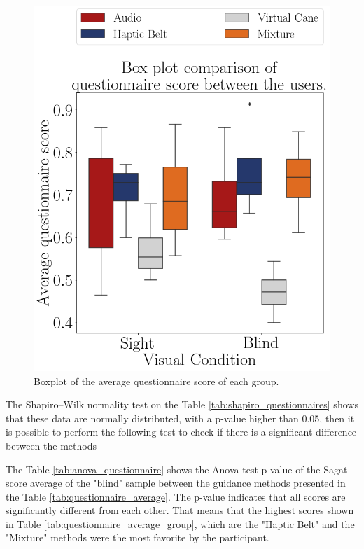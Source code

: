 

\begin{figure}[!htb]
    \centering
    \includegraphics[width = 0.5\linewidth]{Resultados/Questionario/Figuras/png/boxplot_questionnaire_scene.png}
    \caption{Boxplot of the average questionnaire score of each group.}
    \label{fig:boxplot_questionnaire_scene}
\end{figure}

The Shapiro–Wilk normality test on the Table \ref{tab:shapiro_questionnaires} shows that these data are normally distributed, with a p-value higher than 0.05, then it is possible to perform the following test to check if there is a significant difference between the methods



The Table \ref{tab:anova_questionnaire} shows the Anova test p-value of the Sagat score average of the "blind" sample between the guidance methods presented in the Table \ref{tab:questionnaire_average}. The p-value indicates that all scores are significantly different from each other. That means that the highest scores shown in Table \ref{tab:questionnaire_average_group}, which are the "Haptic Belt" and the "Mixture" methods were the most favorite by the participant.



\FloatBarrier